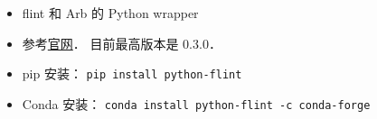 
\begin{issues}
\issueDraft
\end{issues}

\begin{itemize}
\item flint 和 Arb 的 Python wrapper
\item 参考\href{https://fredrikj.net/python-flint/}{官网}． 目前最高版本是 0.3.0．
\item pip 安装： \verb|pip install python-flint|
\item Conda 安装： \verb|conda install python-flint -c conda-forge|
\end{itemize}
